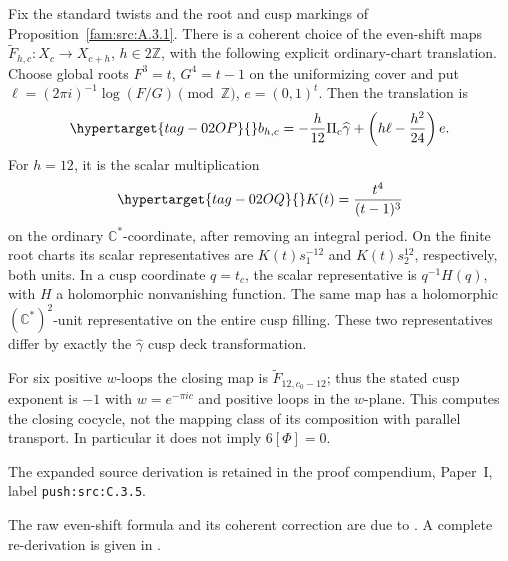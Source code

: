 \begin{cited}\hypertarget{tag-0322}{}\label{push:src:C.3.5}

Fix the standard twists and the root and cusp markings of Proposition~\ref{fam:src:A.3.1}.
There is a coherent choice of the even-shift maps
\(\widetilde F_{h,c}:X_c\to X_{c+h}\), \(h\in2\mathbb Z\),
with the following explicit ordinary-chart translation. Choose global
roots \(F^3=t\), \(G^4=t-1\) on the uniformizing cover and put
\(\ell=(2\pi i)^{-1}\log(F/G)\pmod{\mathbb Z}\), \(e=(0,1)^t\).
Then the translation is
\begin{equation}\hypertarget{tag-02OP}{}\label{mapsI:closing:eq:C-explicit-closing}
 b_{h,c}=-\frac h{12}\Pi_c\widehat\gamma
              +\left(h\ell-\frac{h^2}{24}\right)e.
\end{equation}
For \(h=12\), it is the scalar multiplication
\begin{equation}\hypertarget{tag-02OQ}{}\label{mapsI:closing:eq:C-twelve-scalar}
 K(t)=\frac{t^4}{(t-1)^3}
\end{equation}
on the ordinary \(\mathbb C^*\)-coordinate, after removing an integral
period. On the finite root charts its scalar representatives are
\(K(t)s_1^{-12}\) and \(K(t)s_2^{12}\), respectively, both units.
In a cusp coordinate \(q=t_c\), the scalar representative is
\(q^{-1}H(q)\), with \(H\) a holomorphic nonvanishing function.
The same map has a holomorphic \((\mathbb C^*)^2\)-unit representative
on the entire cusp filling. These two representatives differ by
exactly the \(\widehat\gamma\) cusp deck transformation.

For six positive \(w\)-loops the closing map is
\(\widetilde F_{12,c_0-12}\); thus the stated cusp exponent is \(-1\)
with $w=e^{-\pi i c}$ and positive loops in the $w$-plane. This computes the closing
cocycle, not the mapping class of its composition with parallel
transport. In particular it does not imply \(6[\Phi]=0\).
\end{cited}
The expanded source derivation is retained in the proof compendium, Paper~I, label \nolinkurl{push:src:C.3.5}.




The raw even-shift formula and its coherent correction are due to \citet[Proposition~7.8, pp.~91--92, and Proposition~C.2, p.~102]{DuEtAl2026v1}. A complete re-derivation is given in .




